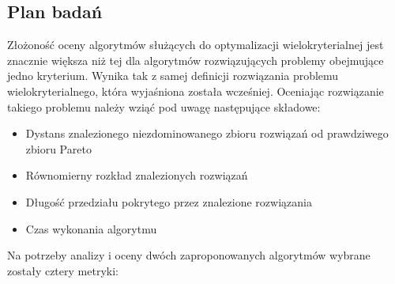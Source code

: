 \documentclass[twoside]{iisthesis}
\begin{document}
\subsection{Plan badań}
Złożoność oceny algorytmów służących do optymalizacji wielokryterialnej jest znacznie większa niż tej dla algorytmów rozwiązujących problemy obejmujące jedno kryterium. Wynika tak z samej definicji rozwiązania problemu wielokryterialnego, która wyjaśniona została wcześniej. Oceniając rozwiązanie takiego problemu należy wziąć pod uwagę następujące składowe:\\
\begin{itemize}
	\item Dystans znalezionego niezdominowanego zbioru rozwiązań od prawdziwego zbioru Pareto
	\item Równomierny rozkład znalezionych rozwiązań
	\item Długość przedziału pokrytego przez znalezione rozwiązania
	\item Czas wykonania algorytmu\\
\end{itemize}
Na potrzeby analizy i oceny dwóch zaproponowanych algorytmów wybrane zostały cztery metryki:
\end{document}
